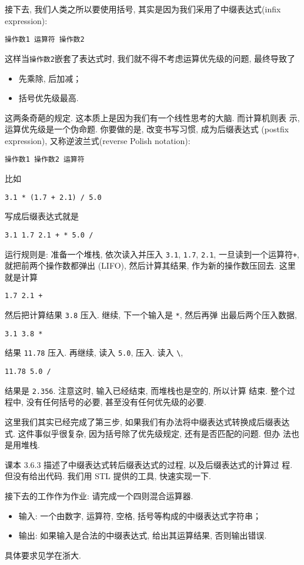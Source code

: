\documentclass[a4paper]{ctexart}
\theoremstyle{definition}
\theoremstyle{definition}
\begin{document}
接下去, 我们人类之所以要使用括号, 其实是因为我们采用了中缀表达式(inﬁx
expression):
\begin{verbatim}
操作数1 运算符 操作数2 
\end{verbatim}
这样当\verb|操作数2|嵌套了表达式时, 我们就不得不考虑运算优先级的问题,
最终导致了
\begin{itemize}
\item 先乘除, 后加减；
\item 括号优先级最高.
\end{itemize}
这两条奇葩的规定. 这本质上是因为我们有一个线性思考的大脑. 而计算机则表
示, 运算优先级是一个伪命题. 你要做的是, 改变书写习惯, 成为后缀表达式
(postﬁx expression), 又称逆波兰式(reverse Polish notation):
\begin{verbatim}
操作数1 操作数2 运算符  
\end{verbatim}
比如
\begin{verbatim}
3.1 * (1.7 + 2.1) / 5.0
\end{verbatim}
写成后缀表达式就是
\begin{verbatim}
3.1 1.7 2.1 + * 5.0 /
\end{verbatim}
运行规则是: 准备一个堆栈, 依次读入并压入 \verb|3.1|, \verb|1.7|,
\verb|2.1|, 一旦读到一个运算符\verb|+|, 就把前两个操作数都弹出
(LIFO), 然后计算其结果, 作为新的操作数压回去. 这里就是计算
\begin{verbatim}
1.7 2.1 +
\end{verbatim}
然后把计算结果 \verb|3.8| 压入. 继续, 下一个输入是 \verb|*|, 然后再弹
出最后两个压入数据,
\begin{verbatim}
3.1 3.8 *
\end{verbatim}
结果 \verb|11.78| 压入. 再继续, 读入 \verb|5.0|, 压入. 读入 \verb|\|,
\begin{verbatim}
11.78 5.0 /
\end{verbatim}
结果是 \verb|2.356|. 注意这时, 输入已经结束, 而堆栈也是空的, 所以计算
结束. 整个过程中, 没有任何括号的必要, 甚至没有任何优先级的必要.

这里我们其实已经完成了第三步, 如果我们有办法将中缀表达式转换成后缀表达
式. 这件事似乎很复杂, 因为括号除了优先级规定, 还有是否匹配的问题. 但办
法也是用堆栈.

课本 3.6.3 描述了中缀表达式转后缀表达式的过程, 以及后缀表达式的计算过
程. 但没有给出代码. 我们用 STL 提供的工具, 快速实现一下.

接下去的工作作为作业: 请完成一个四则混合运算器.
\begin{itemize}
\item 输入: 一个由数字, 运算符, 空格, 括号等构成的中缀表达式字符串；
\item 输出: 如果输入是合法的中缀表达式, 给出其运算结果, 否则输出错误.
\end{itemize}
具体要求见学在浙大. 
\end{document}
